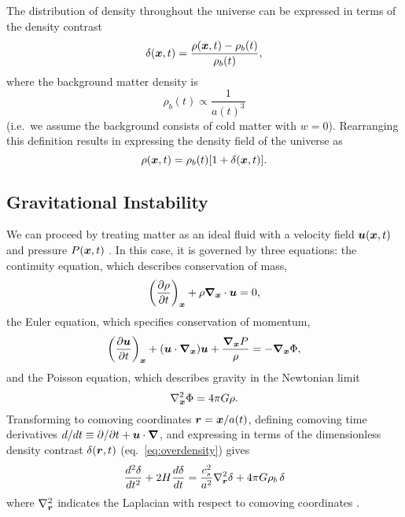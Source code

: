 The distribution of density throughout the universe can be expressed
in terms of the density contrast
\begin{equation}
  \label{eq:overdensity}
  \delta(\boldsymbol{x}, t) = \frac{\rho(\boldsymbol{x}, t) - \rho_b(t)}{\rho_b(t)},
\end{equation}
where the background matter density is
\begin{equation}
  \rho_b(t) \propto \frac{1}{a(t)^3}
\end{equation}
(i.e.~we assume the background consists of cold matter with $w=0$).
Rearranging this definition results in expressing the density field of the
universe as
\begin{equation}
  \rho(\boldsymbol{x}, t) = \rho_b(t)[1 + \delta(\boldsymbol{x}, t)].
\end{equation}

\subsection{Gravitational Instability}
We can proceed by treating matter as an ideal fluid with a
velocity field $\boldsymbol{u}(\boldsymbol{x}, t)$ and pressure $P(\boldsymbol{x}, t)$
\citep{longair2008galaxy}.
In this case, it is governed by three equations: the
continuity equation, which describes conservation of mass,
\begin{equation}
  \label{eq:continuity}
  \left(\frac{\partial\rho}{\partial t}\right)_{\boldsymbol{x}}
  + \rho\boldsymbol{\nabla}_{\boldsymbol{x}}\cdot\boldsymbol{u} = 0,
\end{equation}
the Euler equation, which specifies conservation of momentum,
\begin{equation}
  \label{eq:euler}
  \left(\frac{\partial\boldsymbol{u}}{\partial t}\right)_{\boldsymbol{x}}
  + (\boldsymbol{u}\cdot\boldsymbol{\nabla}_{\boldsymbol{x}})\boldsymbol{u}
  + \frac{\boldsymbol{\nabla}_{\boldsymbol{x}}P}{\rho}
  = -\boldsymbol{\nabla}_{\boldsymbol{x}}\Phi,
\end{equation}
and the Poisson equation, which describes gravity in the Newtonian limit
\begin{equation}
  \nabla_{\boldsymbol{x}}^2\Phi = 4\pi G\rho.
\end{equation}
Transforming to comoving coordinates $\boldsymbol{r} = \boldsymbol{x}/a(t)$,
defining comoving time derivatives
$d/dt \equiv \partial/\partial t + \boldsymbol{u}\cdot\boldsymbol{\nabla}$,
and expressing in terms of the dimensionless density contrast
$\delta(\boldsymbol{r}, t)$ (eq.~\ref{eq:overdensity}) gives
\begin{equation}
  \label{eq:delta_evolution}
  \frac{d^2\delta}{d t^2} + 2 H \frac{d\delta}{d t}
  = \frac{c_s^2}{a^2}\nabla_{\boldsymbol{r}}^2\delta + 4\pi G \rho_b\,\delta
\end{equation}
where $\nabla^2_{\boldsymbol{r}}$ indicates the Laplacian with respect to comoving
coordinates \citep[for derivation see section 11.2 of][]{longair2008galaxy}.

